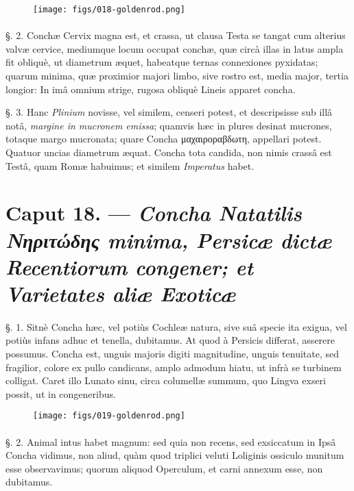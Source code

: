 \documentclass[a4paper, 11pt, oneside, polutonikogreek, german]{article}
\begin{document}
\begin{figure}[H]
\centering
\texttt{[image: figs/018-goldenrod.png]}

\end{figure}
\paragraph{}
§. 2. Conchæ Cervix magna est, et crassa, ut clausa Testa se tangat cum alterius valvæ cervice, mediumque locum occupat conchæ, quæ circà illas in latus ampla fit obliquè, ut diametrum æquet, habeatque ternas connexiones pyxidatas; quarum minima, quæ proximior majori limbo, sive rostro est, media major, tertia longior: In imâ omnium strige, rugosa obliquè Lineis apparet concha.

§. 3. Hanc \emph{Plinium} novisse, vel similem, censeri potest, et descripsisse sub illâ notâ, \emph{margine in mucronem emissa}; quamvis hæc in plures desinat mucrones, totaque margo mucronata; quare Concha μαχαιροραβδωτη, appellari potest. Quatuor uncias diametrum æquat. Concha tota candida, non nimis crassâ est Testâ, quam Romæ habuimus; et similem \emph{Imperatus} habet.

\section{Caput 18. --- \emph{Concha Natatilis Νηριτώδης minima, Persicæ dictæ Recentiorum congener; et Varietates aliæ Exoticæ}}
\paragraph{}
§. 1. Sitnè Concha hæc, vel potiùs Cochleæ natura, sive suâ specie ita exigua, vel potiùs infans adhuc et tenella, dubitamus. At quod à Persicis differat, asserere possumus. Concha est, unguis majoris digiti magnitudine, unguis tenuitate, sed fragilior, colore ex pullo candicans, amplo admodum hiatu, ut infrà se turbinem colligat. Caret illo Lunato sinu, circa columellæ summum, quo Lingva exseri possit, ut in congeneribus.

\begin{figure}[H]
\centering
\texttt{[image: figs/019-goldenrod.png]}

\end{figure}
\paragraph{}
§. 2. Animal intus habet magnum: sed quia non recens, sed exsiccatum in Ipsâ Concha vidimus, non aliud, quàm quod triplici veluti Loliginis ossiculo munitum esse observavimus; quorum aliquod Operculum, et carni annexum esse, non dubitamus.
\end{document}
